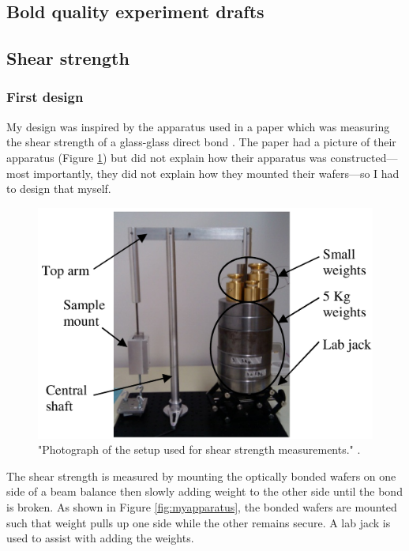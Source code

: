 \documentclass[colorlinks=true,pdfstartview=FitV,linkcolor=blue,
            citecolor=red,urlcolor=magenta]{ligodoc}
\begin{document}
\begin{appendices}

\section{Bold quality experiment drafts}
\label{appendix:bond_quality_experiment_drafts}
\subsection{Shear strength}
\subsubsection{First design}

My design was inspired by the apparatus used in a paper which was measuring the shear strength of a glass-glass direct bond \cite{Helie}. The paper had a picture of their apparatus (Figure \ref{fig:apparatus}) but did not explain how their apparatus was constructed---most importantly, they did not explain how they mounted their wafers---so I had to design that myself.

\begin{figure}[htbp]
\begin{center}
\includegraphics[width=6in]{graphics/apparatus.png}
\caption{"Photograph of the setup used for shear strength measurements." \cite{Helie}.}
\label{fig:apparatus}
\end{center}
\end{figure}

The shear strength is measured by mounting the optically bonded wafers on one side of a beam balance then slowly adding weight to the other side until the bond is broken. As shown in Figure \ref{fig:myapparatus}, the bonded wafers are mounted such that weight pulls up one side while the other remains secure. A lab jack is used to assist with adding the weights.


\end{appendices}
\end{document}
